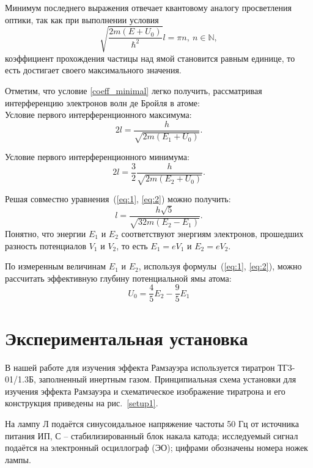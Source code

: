 	Минимум последнего выражения отвечает квантовому аналогу просветления оптики, так как при выполнении условия
	\begin{equation}
		\label{coeff_minimal}
		\sqrt{\frac{2m(E+U_0)}{\hbar^2}}l = \pi n, \ n\in\mathbb{N},
	\end{equation}
	коэффициент прохождения частицы над ямой становится равным единице, то есть достигает своего максимального значения.

	Отметим, что условие \eqref{coeff_minimal} легко получить, рассматривая интерференцию электронов волн де Бройля в атоме:\\
	Условие первого интерференционного максимума:
	\begin{equation}
		\label{eq:1}
		2l = \frac{h}{\sqrt{2m(E_1+U_0)}}.
	\end{equation}

	Условие первого интерференционного минимума:
	\begin{equation}
		\label{eq:2}
		2l =\frac{3}{2} \frac{h}{\sqrt{2m(E_2+U_0)}}.
	\end{equation}			

	Решая совместно уравнения~(\ref{eq:1}, \ref{eq:2}) можно получить:
	\begin{equation}
		\label{eq:3}
		l = \frac{h\sqrt{5}}{\sqrt{32m(E_2-E_1)}}.
	\end{equation}
	Понятно, что энергии $E_1$ и $E_2$ соответствуют энергиям электронов, прошедших разность потенциалов $V_1$ и $V_2$, то есть $E_1 = eV_1$ и $E_2 = eV_2$. 
	
	По измеренным величинам $E_1$ и $E_2$, используя формулы~(\ref{eq:1}, \ref{eq:2}), можно рассчитать эффективную глубину потенциальной ямы атома:
	\begin{equation}
		\label{eq:U_0}
		U_0 = \frac{4}{5}E_2 - \frac{9}{5}E_1
	\end{equation}

\section{Экспериментальная установка}

	В нашей работе для изучения эффекта Рамзауэра используется тиратрон ТГ3-01/1.3Б, заполненный инертным газом. 
	Принципиальная схема установки для изучения эффекта Рамзауэра и схематическое изображение тиратрона и его конструкция приведены на рис.~\ref{setup1}.
		
	На лампу Л подаётся синусоидальное напряжение частоты 50 Гц от источника питания ИП, 
	С -- стабилизированный блок накала катода; исследуемый сигнал подаётся на электронный осциллограф (ЭО); цифрами обозначены номера ножек лампы.
		
